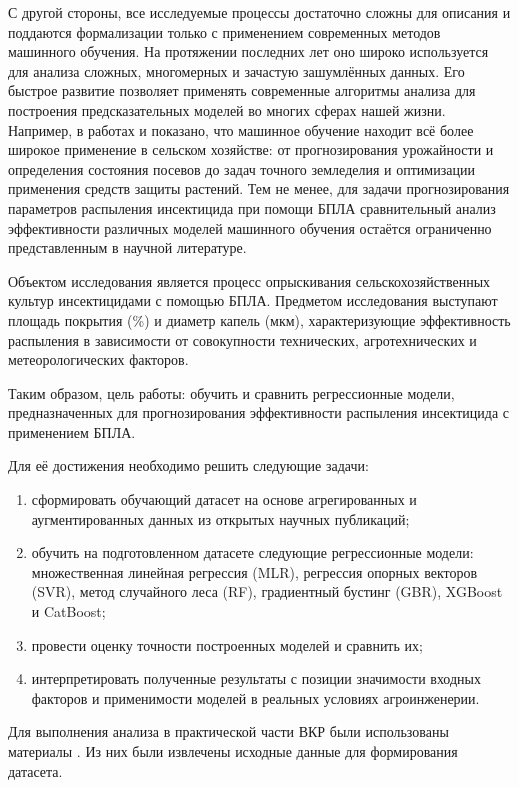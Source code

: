 С другой стороны, все исследуемые процессы достаточно сложны для описания и поддаются формализации только с применением современных методов машинного обучения. На протяжении последних лет оно широко используется для анализа сложных, многомерных и зачастую зашумлённых данных. Его быстрое развитие позволяет применять современные алгоритмы анализа для построения предсказательных моделей во многих сферах нашей жизни. Например, в работах \cite{Liakos2018} и \cite{Jordan2015} показано, что машинное обучение находит всё более широкое применение в сельском хозяйстве: от прогнозирования урожайности и определения состояния посевов до задач точного земледелия и оптимизации применения средств защиты растений. Тем не менее, для задачи прогнозирования параметров распыления инсектицида при помощи БПЛА сравнительный анализ эффективности различных моделей машинного обучения остаётся ограниченно представленным в научной литературе.


Объектом исследования является процесс опрыскивания сельскохозяйственных культур инсектицидами с помощью БПЛА. Предметом исследования выступают площадь покрытия (\%) и диаметр капель (мкм), характеризующие эффективность распыления в зависимости от совокупности технических, агротехнических и метеорологических факторов.


Таким образом, цель работы: обучить и сравнить регрессионные модели, предназначенных для прогнозирования эффективности распыления инсектицида с применением БПЛА.


Для её достижения необходимо решить следующие задачи:

\begin{enumerate}
	\item сформировать обучающий датасет на основе агрегированных и аугментированных данных из открытых научных публикаций;
	\item обучить на подготовленном датасете следующие регрессионные модели: множественная линейная регрессия (MLR), регрессия опорных векторов (SVR), метод случайного леса (RF), градиентный бустинг (GBR), XGBoost и CatBoost;
	\item провести оценку точности построенных моделей и сравнить их;
	\item интерпретировать полученные результаты с позиции значимости входных факторов и применимости моделей в реальных условиях агроинженерии.
\end{enumerate}


Для выполнения анализа в практической части ВКР были использованы материалы \cite{Liu2025, Wu2025, Lopes2023, Vitoria2022, Biglia2022}. Из них были извлечены исходные данные для формирования датасета.


